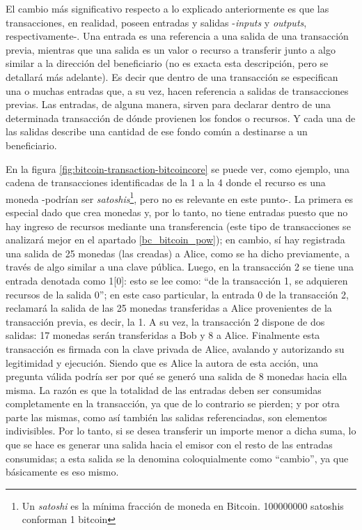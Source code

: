 El cambio más significativo respecto a lo explicado anteriormente es que las transacciones, en realidad, poseen entradas y salidas -\textit{inputs} y \textit{outputs}, respectivamente-. Una entrada es una referencia a una salida de una transacción previa, mientras que una salida es un valor o recurso a transferir junto a algo similar a la dirección del beneficiario (no es exacta esta descripción, pero se detallará más adelante). Es decir que dentro de una transacción se especifican una o muchas entradas que, a su vez, hacen referencia a salidas de transacciones previas. Las entradas, de alguna manera, sirven para declarar dentro de una determinada transacción de dónde provienen los fondos o recursos. Y cada una de las salidas describe una cantidad de ese fondo común a destinarse a un beneficiario.

En la figura \ref{fig:bitcoin-transaction-bitcoincore} se puede ver, como ejemplo, una cadena de transacciones identificadas de la 1 a la 4 donde el recurso es una moneda -podrían ser \textit{satoshis}\footnote{Un \textit{satoshi} es la mínima fracción de moneda en Bitcoin. 100000000 satoshis conforman 1 bitcoin}, pero no es relevante en este punto-. La primera es especial dado que crea monedas y, por lo tanto, no tiene entradas puesto que no hay ingreso de recursos mediante una transferencia (este tipo de transacciones se analizará mejor en el apartado \ref{bc_bitcoin_pow}); en cambio, sí hay registrada una salida de 25 monedas (las creadas) a Alice, como se ha dicho previamente, a través de algo similar a una clave pública. Luego, en la transacción 2 se tiene una entrada denotada como 1{[}0{]}: esto se lee como: ``de la transacción 1, se adquieren recursos de la salida 0''; en este caso particular, la entrada 0 de la transacción 2, reclamará la salida de las 25 monedas transferidas a Alice provenientes de la transacción previa, es decir, la 1. A su vez, la transacción 2 dispone de dos salidas: 17 monedas serán transferidas a Bob y 8 a Alice. Finalmente esta transacción es firmada con la clave privada de Alice, avalando y autorizando su legitimidad y ejecución. Siendo que es Alice la autora de esta acción, una pregunta válida podría ser por qué se generó una salida de 8 monedas hacia ella misma. La razón es que la totalidad de las entradas deben ser consumidas completamente en la transacción, ya que de lo contrario se pierden; y por otra parte las mismas, como así también las salidas referenciadas, son elementos indivisibles. Por lo tanto, si se desea transferir un importe menor a dicha suma, lo que se hace es generar una salida hacia el emisor con el resto de las entradas consumidas; a esta salida se la denomina coloquialmente como ``cambio'', ya que básicamente es eso mismo.

